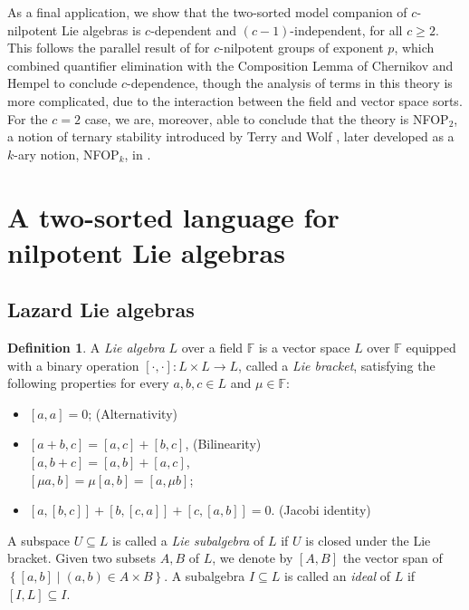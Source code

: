 \documentclass[psamsfonts]{amsart}
\theoremstyle{definition}
\newtheorem{defn}[thm]{Definition}
\theoremstyle{definition}
\theoremstyle{remark}
\newcommand{\brac}[2]{\left[ {#1} , {#2} \right]}
\numberwithin{equation}{section}
\newcommand\F{\mathbb{F}}
\newcommand{\set}[1]{\left\{ {#1} \right\}}
\begin{document}
As a final application, we show that the two-sorted model companion of $c$-nilpotent Lie algebras is $c$-dependent and $(c-1)$-independent, for all $c \geq 2$. This follows the parallel result of \cite{d2023model} for $c$-nilpotent groups of exponent $p$, which combined quantifier elimination with the Composition Lemma of Chernikov and Hempel \cite{ChernikovHempel3} to conclude $c$-dependence, though the analysis of terms in this theory is more complicated, due to the interaction between the field and vector space sorts. For the $c = 2$ case, we are, moreover, able to conclude that the theory is NFOP$_{2}$, a notion of ternary stability introduced by Terry and Wolf \cite{terry2022irregular}, later developed as a $k$-ary notion, NFOP$_k$, in \cite{abdaldaim2023higher}.

\section{A two-sorted language for nilpotent Lie algebras} \label{two sorted section}

\subsection{Lazard Lie algebras}

\begin{defn}
    A \textit{Lie algebra} $L$ over a field $\F$ is a vector space $L$ over $\F$ equipped with a binary operation $[\cdot,\cdot]:L\times L\to L$, called a \textit{Lie bracket}, satisfying the following properties for every $a,b,c\in L$ and $\mu \in \F$:
    \begin{itemize}\itemsep3pt
        \item  $[a,a] = 0$; \hfill (Alternativity)
        \item  $\brac{a+b}{c} = \brac{a}{c}+\brac{b}{c}$,  \hfill (Bilinearity) \\ 
        $\brac{a}{b+c} = \brac{a}{b}+\brac{a}{c}$,\\
        $[\mu a,b]=\mu[a,b]=[a, \mu b]$;
        \item $\brac{a}{\brac{b}{c}}+\brac{b}{\brac{c}{a}}+\brac{c}{\brac{a}{b}}=0$. \hfill (Jacobi identity) 
    \end{itemize}
\end{defn}

A subspace $U\subseteq L$ is called a \textit{Lie subalgebra} of $L$ if $U$ is closed under the Lie bracket. Given two subsets $A,B$ of $L$, we denote by $[A,B]$ the vector span of $\set{[a,b]\mid (a,b)\in A\times B}$. A subalgebra $I\subseteq L$ is called an \textit{ideal} of $L$ if $\brac{I}{L}\subseteq I$. 
\end{document}
